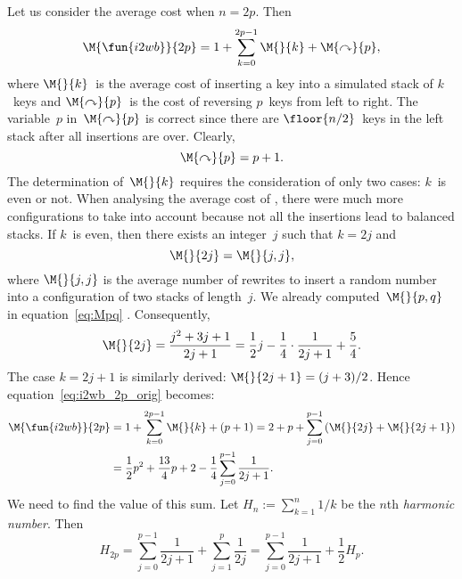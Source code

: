 Let us consider the average cost when \(n=2p\). Then
\begin{equation}
  \M{\fun{i2wb}}{2p} = 1 + \sum_{k=0}^{2p-1}{\M{}{k}} + \M{\curvearrowright}{p},
  \label{eq:i2wb_2p_orig}
\end{equation}
where \(\M{}{k}\)~is the average cost of inserting a key into a
simulated stack of \(k\)~keys and
\(\M{\curvearrowright}{p}\)~is
the cost of reversing \(p\)~keys from left to right. The variable~\(p\)
in~\(\M{\curvearrowright}{p}\) is correct since there are
\(\floor{n/2}\)~keys in the left stack after all insertions are
over. Clearly,
\begin{equation*}
  \M{\curvearrowright}{p} = p + 1.
\end{equation*}
The determination of~\(\M{}{k}\) requires the consideration of only
two cases: \(k\)~is even or not. When analysing the average cost of
, there were much more configurations to take into account
because not all the insertions lead to balanced stacks. If \(k\)~is
even, then there exists an integer~\(j\) such that \(k=2j\) and
\begin{equation*}
\M{}{2j} = \M{}{j,j},
\end{equation*}
where \(\M{}{j,j}\) is the average number of rewrites to insert a
random number into a configuration of two stacks of length~\(j\). We
already computed~\(\M{}{p,q}\) in equation~\eqref{eq:Mpq}
. Consequently,
\begin{equation*}
\M{}{2j} = \frac{j^2 + 3j + 1}{2j+1}
         = \frac{1}{2}{j} - \frac{1}{4} \cdot \frac{1}{2j+1} +
         \frac{5}{4}.
\end{equation*}
The case \(k=2j+1\) is similarly derived: \(\M{}{2j+1} =
(j+3)/2\). Hence equation~\eqref{eq:i2wb_2p_orig} becomes:
\begin{align}
\M{\fun{i2wb}}{2p}
  &= 1 + \sum_{k=0}^{2p-1}{\M{}{k}} + (p+1)
   = 2 + p + \sum_{j=0}^{p-1}{(\M{}{2j} + \M{}{2j+1})}\notag\\
  &= \frac{1}{2}{p^2} + \frac{13}{4}{p} + 2 -
             \frac{1}{4}\sum_{j=0}^{p-1}{\frac{1}{2j+1}}.
\label{eq:i2wb_2p}
\end{align}
We need to find the value of this sum. Let \(H_n :=
\sum_{k=1}^n{1/k}\) be the \(n\)th \emph{harmonic
  number}. Then
\begin{equation*}
H_{2p} = \sum_{j=0}^{p-1}{\frac{1}{2j+1}} + \sum_{j=1}^{p}{\frac{1}{2j}}
      = \sum_{j=0}^{p-1}{\frac{1}{2j+1}} + \frac{1}{2}{H_{p}}.
\end{equation*}
